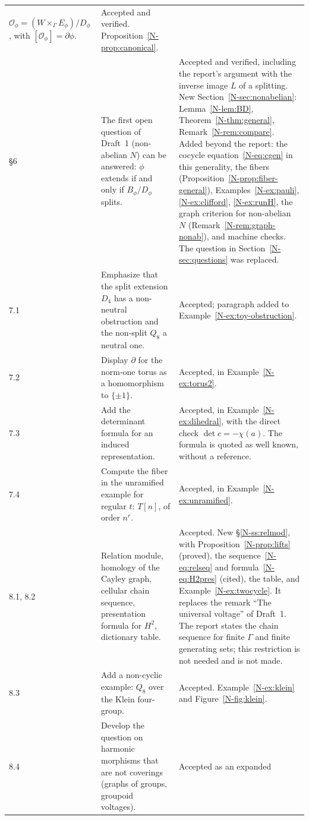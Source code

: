 \documentclass[12pt,letterpaper]{article}
\begin{document}
\begin{longtable}{@{}p{}p{}p{}@{}}
$\mathcal{O}_\phi=(W\times_\Gamma E_\phi)/D_\phi$, with
$[\mathcal{O}_\phi]=\partial\phi$. & Accepted and verified.
Proposition~\ref{N-prop:canonical}. \\
\S6 & The first open question of Draft~1 (non-abelian $N$) can be
answered: $\phi$ extends if and only if $B_\phi/D_\phi$ splits. &
Accepted and verified, including the report's argument with the inverse
image $L$ of a splitting. New Section~\ref{N-sec:nonabelian}:
Lemma~\ref{N-lem:BD}, Theorem~\ref{N-thm:general},
Remark~\ref{N-rem:compare}. Added beyond the report: the cocycle
equation~\eqref{N-eq:cgen} in this generality, the fibers
(Proposition~\ref{N-prop:fiber-general}),
Examples~\ref{N-ex:pauli}, \ref{N-ex:clifford}, \ref{N-ex:runH}, the
graph criterion for non-abelian $N$ (Remark~\ref{N-rem:graph-nonab}), and
machine checks. The question in Section~\ref{N-sec:questions} was
replaced. \\
7.1 & Emphasize that the split extension $D_4$ has a non-neutral
obstruction and the non-split $Q_8$ a neutral one. & Accepted; paragraph
added to Example~\ref{N-ex:toy-obstruction}. \\
7.2 & Display $\partial$ for the norm-one torus as a homomorphism to
$\{\pm1\}$. & Accepted, in Example~\ref{N-ex:torus2}. \\
7.3 & Add the determinant formula for an induced representation. &
Accepted, in Example~\ref{N-ex:dihedral}, with the direct check
$\det c=-\chi(a)$. The formula is quoted as well known, without a
reference. \\
7.4 & Compute the fiber in the unramified example for regular $t$:
$T[n]$, of order $n^r$. & Accepted, in Example~\ref{N-ex:unramified}. \\
8.1, 8.2 & Relation module, homology of the Cayley graph, cellular chain
sequence, presentation formula for $H^2$, dictionary table. & Accepted.
New \S\ref{N-ss:relmod}, with Proposition~\ref{N-prop:lifts} (proved),
the sequence~\eqref{N-eq:relseq} and formula~\eqref{N-eq:H2pres} (cited),
the table, and Example~\ref{N-ex:twocycle}. It replaces the remark ``The
universal voltage'' of Draft~1. The report states the chain sequence for
finite $\Gamma$ and finite generating sets; this restriction is not
needed and is not made. \\
8.3 & Add a non-cyclic example: $Q_8$ over the Klein four-group. &
Accepted. Example~\ref{N-ex:klein} and Figure~\ref{N-fig:klein}. \\
8.4 & Develop the question on harmonic morphisms that are not coverings
(graphs of groups, groupoid voltages). & Accepted as an expanded

\end{longtable}
\end{document}
